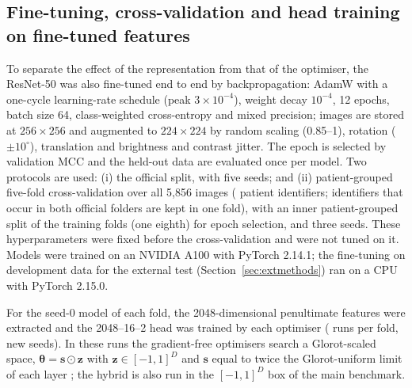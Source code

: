 \documentclass[10pt,letterpaper]{article}
\begin{document}
\subsection{Fine-tuning, cross-validation and head training on fine-tuned features}\label{sec:ftmethods}
To separate the effect of the representation from that of the optimiser, the ResNet-50 was also fine-tuned end to end by backpropagation: AdamW \citep{loshchilov2019adamw} with a one-cycle learning-rate schedule (peak $3\times10^{-4}$), weight decay $10^{-4}$, 12 epochs, batch size 64, class-weighted cross-entropy and mixed precision; images are stored at $256\times256$ and augmented to $224\times224$ by random scaling (0.85--1), rotation ($\pm10^{\circ}$), translation and brightness and contrast jitter. The epoch is selected by validation MCC and the held-out data are evaluated once per model. Two protocols are used: (i) the official split, with five seeds; and (ii) patient-grouped five-fold cross-validation over all 5,856 images (\CvPatients{} patient identifiers; identifiers that occur in both official folders are kept in one fold), with an inner patient-grouped split of the training folds (one eighth) for epoch selection, and three seeds. These hyperparameters were fixed before the cross-validation and were not tuned on it. Models were trained on an NVIDIA A100 with PyTorch 2.14.1; the fine-tuning on development data for the external test (Section~\ref{sec:extmethods}) ran on a CPU with PyTorch 2.15.0.

For the seed-0 model of each fold, the 2048-dimensional penultimate features were extracted and the 2048--16--2 head was trained by each optimiser (\CvHeadRuns{} runs per fold, new seeds). In these runs the gradient-free optimisers search a Glorot-scaled space, $\bm\theta=\mathbf{s}\odot\mathbf{z}$ with $\mathbf{z}\in[-1,1]^D$ and $\mathbf{s}$ equal to twice the Glorot-uniform limit of each layer \citep{glorot2010}; the hybrid is also run in the $[-1,1]^D$ box of the main benchmark.
\end{document}
